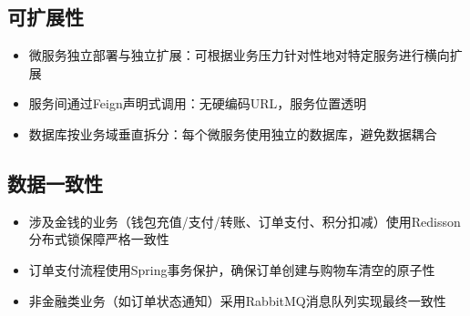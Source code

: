\subsection{可扩展性}

\begin{itemize}
	\item 微服务独立部署与独立扩展：可根据业务压力针对性地对特定服务进行横向扩展
	\item 服务间通过Feign声明式调用：无硬编码URL，服务位置透明
	\item 数据库按业务域垂直拆分：每个微服务使用独立的数据库，避免数据耦合
\end{itemize}

\subsection{数据一致性}

\begin{itemize}
	\item 涉及金钱的业务（钱包充值/支付/转账、订单支付、积分扣减）使用Redisson分布式锁保障严格一致性
	\item 订单支付流程使用Spring事务保护，确保订单创建与购物车清空的原子性
	\item 非金融类业务（如订单状态通知）采用RabbitMQ消息队列实现最终一致性
\end{itemize}
